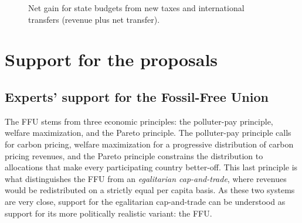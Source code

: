 \documentclass[12pt,english]{article}
\begin{document}
\begin{figure}[h!] 
  \caption{Net gain for state budgets from new taxes and international transfers (revenue plus net transfer).}\label{fig:budget_gain_both_taxes}
\end{figure}





\clearpage

\section{Support for the proposals\label{sec:support}}

\subsection{Experts' support for the Fossil-Free Union\label{subsec:expert_support}}

The FFU stems from three economic principles: the polluter-pay principle, welfare maximization, and the Pareto principle. The polluter-pay principle calls for carbon pricing, welfare maximization for a progressive distribution of carbon pricing revenues, and the Pareto principle constrains the distribution to allocations that make every participating country better-off. This last principle is what distinguishes the FFU from an \textit{egalitarian cap-and-trade}, where revenues would be redistributed on a strictly equal per capita basis. As these two systems are very close, support for the egalitarian cap-and-trade can be understood as support for its more politically realistic variant: the FFU. 
\end{document}
